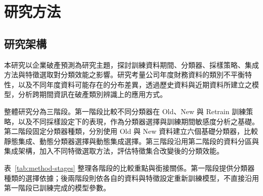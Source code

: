 \chapter{研究方法}\label{chap:method}
\begingroup
\setlength{\emergencystretch}{2em}

\section{研究架構}\label{sec:method-framework}

本研究以企業破產預測為研究主題，探討訓練資料期間、分類器、採樣策略、集成方法與特徵選取對分類效能之影響。研究考量公司年度財務資料的類別不平衡特性，以及不同年度資料可能存在的分布差異，透過歷史資料與近期資料所建立之模型，分析跨期間資訊在破產類別辨識上的應用方式。

整體研究分為三階段。第一階段比較不同分類器在 Old、New 與 Retrain 訓練策略，以及不同採樣設定下的表現，作為分類器選擇與訓練期間敏感度分析之基礎。第二階段固定分類器種類，分別使用 Old 與 New 資料建立六個基礎分類器，比較靜態集成、動態分類器選擇與動態集成選擇。第三階段沿用第二階段的資料分區與集成架構，加入不同特徵選取方法，評估特徵集合改變後的分類效能。

表~\ref{tab:method-stages} 整理各階段的比較重點與銜接關係。第一階段提供分類器種類的選擇依據；後兩階段則依各自的資料與特徵設定重新訓練模型，不直接沿用第一階段已訓練完成的模型參數。


